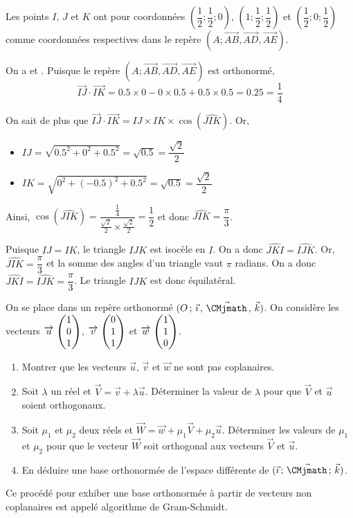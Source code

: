 \documentclass[11pt,fleqn, openany]{book} %
\begin{document}
\begin{solution}Les points $I$, $J$ et $K$  ont pour coordonnées $\left( \dfrac{1}{2};\dfrac{1}{2};0\right)$, $\left(1;\dfrac{1}{2};\dfrac{1}{2}\right)$ et $\left( \dfrac{1}{2} ; 0;\dfrac{1}{2}\right)$ comme coordonnées respectives dans le repère $(A;\overrightarrow{AB},\overrightarrow{AD},\overrightarrow{AE})$.

On a  et . Puisque le repère $(A;\overrightarrow{AB},\overrightarrow{AD},\overrightarrow{AE})$ est orthonormé,
\[ \overrightarrow{IJ}\cdot \overrightarrow{IK}=0.5 \times 0 - 0 \times 0.5 + 0.5 \times 0.5 = 0.25 = \dfrac{1}{4} \]

On sait de plus que $\overrightarrow{IJ} \cdot \overrightarrow{IK}=IJ \times IK \times \cos (\widehat{JIK})$. Or,
\begin{itemize}
\item $IJ=\sqrt{0.5^2+0^2+0.5^2}=\sqrt{0.5}=\dfrac{\sqrt{2}}{2}$
\item $IK=\sqrt{0^2+(-0.5)^2+0.5^2}=\sqrt{0.5}=\dfrac{\sqrt{2}}{2}$
\end{itemize}
Ainsi, $\cos (\widehat{JIK})=\dfrac{\frac{1}{4}}{\frac{\sqrt{2}}{2}\times \frac{\sqrt{2}}{2}}=\dfrac{1}{2}$ et donc $\widehat{JIK}=\dfrac{\pi}{3}$.

 Puisque $IJ=IK$, le triangle $IJK$ est isocèle en $I$. On a donc  $\widehat{JKI}=\widehat{IJK}$. Or, $\widehat{JIK}=\dfrac{\pi}{3}$ et la somme des angles d'un triangle vaut $\pi$ radians. On a donc $\widehat{JKI}=\widehat{IJK}=\dfrac{\pi}{3}$. Le triangle $IJK$ est donc équilatéral.\end{solution}
 
\begin{exercise}[topic=geom12]On se place dans un repère orthonormé $\Oijk$. On considère les vecteurs $\coorde{u}{1}{0}{1}$, $\coorde{v}{0}{1}{1}$ et $\coorde{w}{1}{1}{0}$.
\begin{enumerate}
\item Montrer que les vecteurs $\vec u$, $\vec v$ et $\vec w$ ne sont pas coplanaires.
\item Soit $\lambda$ un réel et $\vec V = \vec v + \lambda \vec u$. Déterminer la valeur de $\lambda$ pour que $\vec V$ et $\vec u$ soient orthogonaux.
\item Soit $\mu_1$ et $\mu_2$ deux réels et $\vec W = \vec w + \mu_1 \vec V + \mu_2 \vec u$. Déterminer les valeurs de $\mu_1$ et $\mu_2$ pour que le vecteur $\vec W$ soit orthogonal aux vecteurs $\vec V$ et $\vec u$.
\item En déduire une base orthonormée de l'espace différente de $(\vec{\imath}\, ;\, \vec{\CMjmath} \,;\, \vec k)$.
\end{enumerate}
Ce procédé pour exhiber une base orthonormée à partir de vecteurs non coplanaires est appelé algorithme de Gram-Schmidt.\end{exercise}
\end{document}

